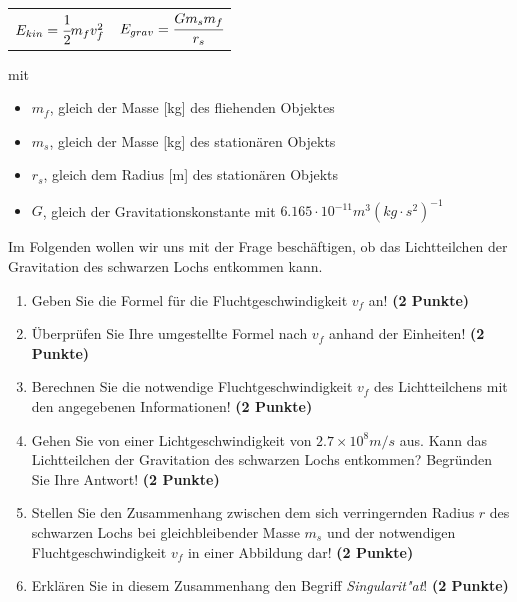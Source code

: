 \documentclass[a4paper, 10pt]{scrartcl}\usepackage[]{graphicx}\usepackage[]{xcolor}
\begin{document}
\begin{center}
  \begin{tabular}{cc}
    $E_{kin} = \cfrac{1}{2}m_fv_f^2$ & $E_{grav} = \cfrac{Gm_sm_f}{r_s}$\\
  \end{tabular}
\end{center}

mit

\begin{itemize}[noitemsep]
\item $m_f$, gleich der Masse [kg] des fliehenden Objektes
\item $m_s$, gleich der Masse [kg] des station{\"a}ren Objekts
\item $r_s$, gleich dem Radius [m] des station{\"a}ren Objekts  
\item $G$, gleich der Gravitationskonstante mit $6.165 \cdot 10^{-11}
  m^3(kg \cdot s^2)^{-1}$ 
\end{itemize}

Im Folgenden wollen wir uns mit der Frage besch{\"a}ftigen, ob das
Lichtteilchen der Gravitation des schwarzen Lochs entkommen kann.

\begin{enumerate}
\item Geben Sie die Formel f{\"u}r die Fluchtgeschwindigkeit $v_f$ an! 
  \textbf{(2 Punkte)}
\item {\"U}berpr{\"u}fen Sie Ihre umgestellte Formel nach $v_f$ anhand der Einheiten!
  \textbf{(2 Punkte)} 
\item Berechnen Sie die notwendige Fluchtgeschwindigkeit $v_f$ des
  Lichtteilchens mit den angegebenen Informationen! \textbf{(2 Punkte)}
\item Gehen Sie von einer Lichtgeschwindigkeit von $\ensuremath{2.7\times 10^{8}}m/s$
  aus. Kann das Lichtteilchen der Gravitation des schwarzen Lochs
  entkommen? Begr{\"u}nden Sie Ihre Antwort! \textbf{(2 Punkte)}
\item Stellen Sie den Zusammenhang zwischen dem sich verringernden Radius
  $r$ des schwarzen Lochs bei gleichbleibender Masse $m_s$
  und der notwendigen Fluchtgeschwindigkeit $v_f$ in einer Abbildung dar!
  \textbf{(2 Punkte)}
\item Erkl{\"a}ren Sie in diesem Zusammenhang den Begriff
  \textit{Singularit{"a}t}! \textbf{(2 Punkte)} 
\end{enumerate}

 
\clearpage
\end{document}
